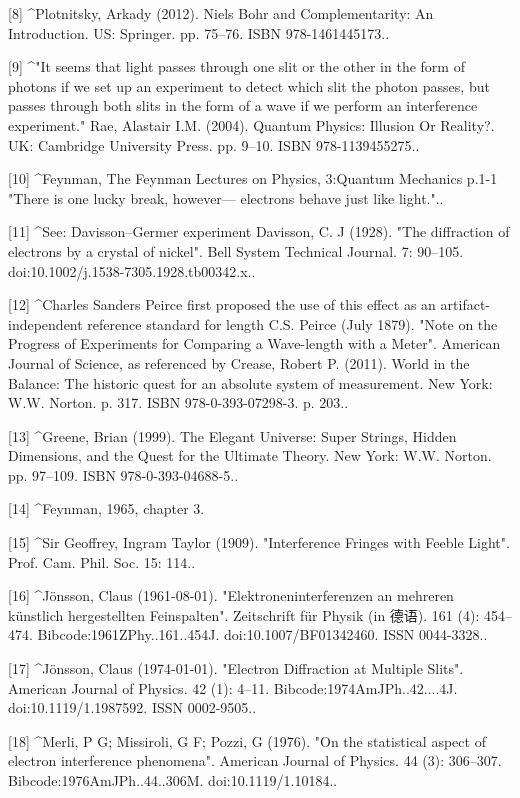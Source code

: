 [8]
^Plotnitsky, Arkady (2012). Niels Bohr and Complementarity: An Introduction. US: Springer. pp. 75–76. ISBN 978-1461445173..

[9]
^"It seems that light passes through one slit or the other in the form of photons if we set up an experiment to detect which slit the photon passes, but passes through both slits in the form of a wave if we perform an interference experiment." Rae, Alastair I.M. (2004). Quantum Physics: Illusion Or Reality?. UK: Cambridge University Press. pp. 9–10. ISBN 978-1139455275..

[10]
^Feynman, The Feynman Lectures on Physics, 3:Quantum Mechanics p.1-1 "There is one lucky break, however— electrons behave just like light."..

[11]
^See: Davisson–Germer experiment Davisson, C. J (1928). "The diffraction of electrons by a crystal of nickel". Bell System Technical Journal. 7: 90–105. doi:10.1002/j.1538-7305.1928.tb00342.x..

[12]
^Charles Sanders Peirce first proposed the use of this effect as an artifact-independent reference standard for length C.S. Peirce (July 1879). "Note on the Progress of Experiments for Comparing a Wave-length with a Meter". American Journal of Science, as referenced by Crease, Robert P. (2011). World in the Balance: The historic quest for an absolute system of measurement. New York: W.W. Norton. p. 317. ISBN 978-0-393-07298-3. p. 203..

[13]
^Greene, Brian (1999). The Elegant Universe: Super Strings, Hidden Dimensions, and the Quest for the Ultimate Theory. New York: W.W. Norton. pp. 97–109. ISBN 978-0-393-04688-5..

[14]
^Feynman, 1965, chapter 3.

[15]
^Sir Geoffrey, Ingram Taylor (1909). "Interference Fringes with Feeble Light". Prof. Cam. Phil. Soc. 15: 114..

[16]
^Jönsson, Claus (1961-08-01). "Elektroneninterferenzen an mehreren künstlich hergestellten Feinspalten". Zeitschrift für Physik (in 德语). 161 (4): 454–474. Bibcode:1961ZPhy..161..454J. doi:10.1007/BF01342460. ISSN 0044-3328..

[17]
^Jönsson, Claus (1974-01-01). "Electron Diffraction at Multiple Slits". American Journal of Physics. 42 (1): 4–11. Bibcode:1974AmJPh..42....4J. doi:10.1119/1.1987592. ISSN 0002-9505..

[18]
^Merli, P G; Missiroli, G F; Pozzi, G (1976). "On the statistical aspect of electron interference phenomena". American Journal of Physics. 44 (3): 306–307. Bibcode:1976AmJPh..44..306M. doi:10.1119/1.10184..

